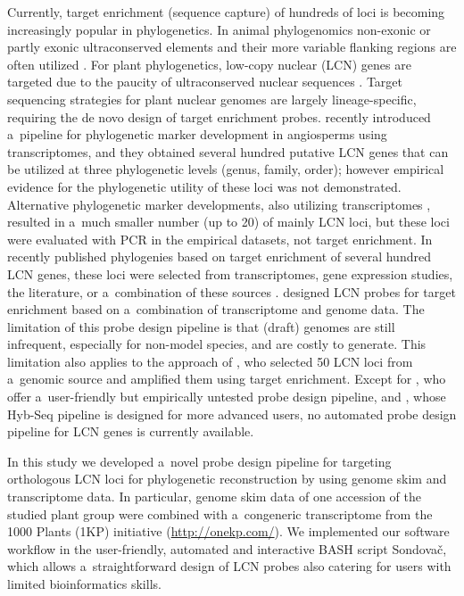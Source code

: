 \documentclass[a4paper, 11pt, twoside]{article}
\begin{document}
Currently, target enrichment (sequence capture) of hundreds of loci is becoming increasingly popular in phylogenetics. In animal phylogenomics non-exonic or partly exonic ultraconserved elements and their more variable flanking regions are often utilized \citep[e.g.][]{Faircloth2012, Hedtke2013, Smith2014}. For plant phylogenetics, low-copy nuclear (LCN) genes are targeted \citep{Mandel2014, Weitemier2014, Grover2015, Heyduk2015, Mandel2015, Nicholls2015, Stephens2015a, Stephens2015} due to the paucity of ultraconserved nuclear sequences \citep{Reneker2012}. Target sequencing strategies for plant nuclear genomes are largely lineage-specific, requiring the de novo design of target enrichment probes. \citet{Chamala2015a} recently introduced a~pipeline for phylogenetic marker development in angiosperms using transcriptomes, and they obtained several hundred putative LCN genes that can be utilized at three phylogenetic levels (genus, family, order); however empirical evidence for the phylogenetic utility of these loci was not demonstrated. Alternative phylogenetic marker developments, also utilizing transcriptomes \citep{Pillon2014, Rothfels2013, Tonnabel2014}, resulted in a~much smaller number (up to 20) of mainly LCN loci, but these loci were evaluated with PCR in the empirical datasets, not target enrichment. In recently published phylogenies based on target enrichment of several hundred LCN genes, these loci were selected from transcriptomes, gene expression studies, the literature, or a~combination of these sources \citep{Mandel2014, Grover2015, Heyduk2015, Mandel2015, Nicholls2015, Stephens2015a, Stephens2015}. \citet{Weitemier2014} designed LCN probes for target enrichment based on a~combination of transcriptome and genome data. The limitation of this probe design pipeline is that (draft) genomes are still infrequent, especially for non-model species, and are costly to generate. This limitation also applies to the approach of \citet{DeSousa2014}, who selected 50 LCN loci from a~genomic source and amplified them using target enrichment. Except for \citet{Chamala2015a}, who offer a~user-friendly but empirically untested probe design pipeline, and \citet{Weitemier2014}, whose Hyb-Seq pipeline is designed for more advanced users, no automated probe design pipeline for LCN genes is currently available.

In this study \citep{Schmickl2016} we developed a~novel probe design pipeline for targeting orthologous LCN loci for phylogenetic reconstruction by using genome skim and transcriptome data. In particular, genome skim data of one accession of the studied plant group were combined with a~congeneric transcriptome from the 1000 Plants (1KP) initiative (\url{http://onekp.com/}). We implemented our software workflow in the user-friendly, automated and interactive BASH script Sondovač, which allows a~straightforward design of LCN probes also catering for users with limited bioinformatics skills.
\end{document}
